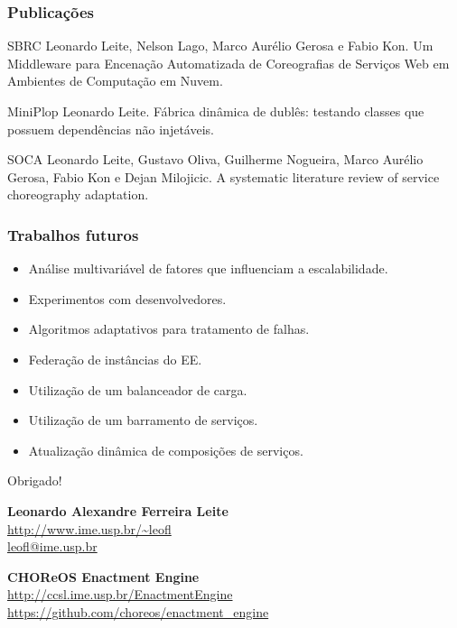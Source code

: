 \documentclass{beamer}
\begin{document}
\begin{frame}
\frametitle{Publicações}

\begin{block}{SBRC}
Leonardo Leite, Nelson Lago, Marco Aurélio Gerosa e Fabio Kon. Um Middleware para Encenação Automatizada de Coreografias de Serviços Web em Ambientes de Computação em Nuvem.
\end{block}

\begin{block}{MiniPlop}
Leonardo Leite. Fábrica dinâmica de dublês: testando classes que possuem dependências não injetáveis. 
\end{block}

\begin{block}{SOCA}
Leonardo Leite, Gustavo Oliva, Guilherme Nogueira, Marco Aurélio Gerosa, Fabio Kon e Dejan Milojicic. A systematic literature review of service choreography adaptation. 
\end{block}


\end{frame}


\begin{frame}
\frametitle{Trabalhos futuros}

\begin{itemize}
\item Análise multivariável de fatores que influenciam a escalabilidade.
\item Experimentos com desenvolvedores.
\item Algoritmos adaptativos para tratamento de falhas.
\item Federação de instâncias do EE.
\item Utilização de um balanceador de carga.
\item Utilização de um barramento de serviços.
\item Atualização dinâmica de composições de serviços.
\end{itemize}

\end{frame}


\begin{frame}

{\Huge \centerline{Obrigado! }}

\vspace{1cm}

\textbf{Leonardo Alexandre Ferreira Leite} \\
\url{http://www.ime.usp.br/~leofl} \\
\url{leofl@ime.usp.br} \\

\vspace{0.6cm}

\textbf{CHOReOS Enactment Engine} \\
\url{http://ccsl.ime.usp.br/EnactmentEngine} \\
\url{https://github.com/choreos/enactment_engine}
\end{frame}

\end{document}
